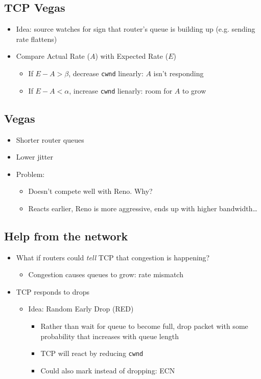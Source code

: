 \subsection{TCP Vegas}
\begin{itemize}[nosep]
    \item Idea: source watches for sign that router's queue is building up (e.g. sending rate flattens)
    \item Compare Actual Rate ($A$) with Expected Rate ($E$)
          \begin{itemize}[nosep]
              \item If $E - A > \beta$, decrease \texttt{cwnd} linearly: $A$ isn't responding
              \item If $E - A < \alpha$, increase \texttt{cwnd} lienarly: room for $A$ to grow
          \end{itemize}
\end{itemize}
\subsection{Vegas}
\begin{itemize}[nosep]
    \item Shorter router queues
    \item Lower jitter
    \item Problem:
          \begin{itemize}[nosep]
              \item Doesn't compete well with Reno. Why?
              \item Reacts earlier, Reno is more aggressive, ends up with higher bandwidth\dots
          \end{itemize}
\end{itemize}
\subsection{Help from the network}
\begin{itemize}[nosep]
    \item What if routers could \emph{tell} TCP that congestion is happening?
          \begin{itemize}[nosep]
              \item Congestion causes queues to grow: rate mismatch
          \end{itemize}
    \item TCP responds to drops
          \begin{itemize}[nosep]
              \item Idea: Random Early Drop (RED)
                    \begin{itemize}[nosep]
                        \item Rather than wait for queue to become full, drop packet with some probability that increases with queue length
                        \item TCP will react by reducing \texttt{cwnd}
                        \item Could also mark instead of dropping: ECN
                    \end{itemize}
          \end{itemize}
\end{itemize}

